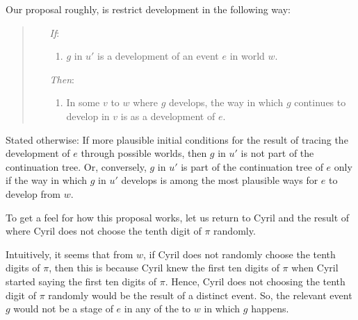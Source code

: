 \begin{note}
  Our proposal roughly, is restrict development in the following way:
  \begin{quote}
    \begin{itemize}
    \item[\emph{If}:]
      \begin{enumerate}[label=\alph*., ref=(\alph*)]
      \item
        \label{myR:sketch:a}
        \(g\) in \(u'\) is a \drAdj{} development of an event \(e\) in world \(w\).
      \end{enumerate}
    \item[\emph{Then}:]
      \begin{enumerate}[label=\alph*., ref=(\alph*), resume]
      \item
        \label{myR:sketch:b}
        In some  \(v\) to \(w\) where \(g\) develops, the way in which \(g\) continues to develop in \(v\) is as a development of \(e\).
      \end{enumerate}
    \end{itemize}
  \end{quote}

  Stated otherwise:
  If more plausible initial conditions for the result of tracing the development of \(e\) through possible worlds, then \(g\) in \(u'\) is not part of the continuation tree.
  Or, conversely, \(g\) in \(u'\) is part of the continuation tree of \(e\) only if the way in which \(g\) in \(u'\) develops is among the most plausible ways for \(e\) to develop from \(w\).
\end{note}

\begin{note}
  To get a feel for how this proposal works, let us return to Cyril and the result of  where Cyril does not choose the tenth digit of \(\pi\) randomly.

  Intuitively, it seems that from \(w\), if Cyril does not randomly choose the tenth digits of \(\pi\), then this is because Cyril knew the first ten digits of \(\pi\) when Cyril started saying the first ten digits of \(\pi\).
  Hence, Cyril does not choosing the tenth digit of \(\pi\) randomly would be the result of a distinct event.
  So, the relevant event \(g\) would not be a stage of \(e\) in any of the  to \(w\) in which \(g\) happens.
\end{note}

